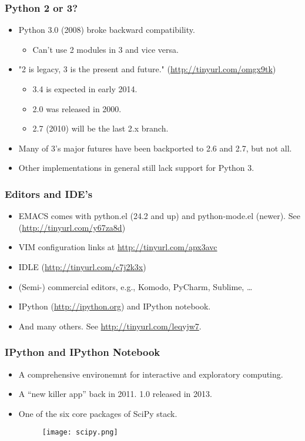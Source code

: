 \documentclass{beamer}
\begin{document}
\begin{frame}[fragile]
\frametitle{Python 2 or 3?}
\begin{itemize}

\item Python 3.0 (2008) broke backward compatibility.
\begin{itemize}
\item Can't use 2 modules in 3 and vice versa.
\end{itemize}

\item "2 is legacy, 3 is the
       present and future." (\url{http://tinyurl.com/omgx9tk})
\begin{itemize}
\item 3.4 is expected in early 2014.
\item 2.0 was released in 2000.
\item 2.7 (2010) will be the last 2.x branch.
\end{itemize}

\item Many of 3's major futures have been backported to 2.6 and 2.7, 
      but not all. 
\item Other implementations in general still
      lack support for Python 3.
\end{itemize}
\end{frame}

\begin{frame}[fragile]
\frametitle{Editors and IDE's}
\begin{itemize}
\item EMACS comes with python.el (24.2 and up) and
      python-mode.el (newer). See (\url{http://tinyurl.com/y67za8d})
\item VIM configuration links at \url{http://tinyurl.com/apx3avc}
\item IDLE (\url{http://tinyurl.com/c7j2k3x})
\item (Semi-) commercial editors, e.g., Komodo, PyCharm, Sublime, \ldots 
\item IPython (\url{http://ipython.org}) and IPython notebook.
\item And many others. See \url{http://tinyurl.com/leqyjw7}.
\end{itemize}
\end{frame}

\begin{frame}[fragile]
\frametitle{IPython and IPython Notebook}
\begin{itemize}
\item A comprehensive environemnt for interactive and exploratory
      computing.
\item A ``new killer app'' back in 2011. 1.0 released in 2013.
\item One of the six core packages of SciPy stack.
\begin{figure}[h]
\texttt{[image: scipy.png]}
\end{figure}
\end{itemize}
\end{frame}
\end{document}
